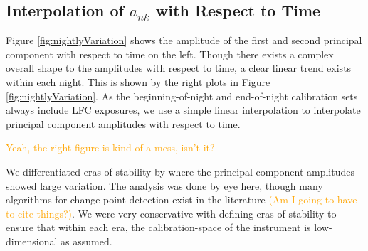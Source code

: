 \documentclass[twocolumn]{aastex63}
\newcommand{\lz}[1]{\textcolor{orange}{#1}}
\begin{document}
\subsection{Interpolation of $a_{nk}$ with Respect to Time}
Figure \ref{fig:nightlyVariation} shows the amplitude of the first and second principal component with respect to time on the left.  Though there exists a complex overall shape to the amplitudes with respect to time, a clear linear trend exists within each night.  This is shown by the right plots in Figure  \ref{fig:nightlyVariation}.  As the beginning-of-night and end-of-night calibration sets always include LFC exposures, we use a simple linear interpolation to interpolate principal component amplitudes with respect to time.

\lz{Yeah, the right-figure is kind of a mess, isn't it?}

We differentiated eras of stability by where the principal component amplitudes showed large variation.  The analysis was done by eye here, though many algorithms for change-point detection exist in the literature \lz{(Am I going to have to cite things?)}.  We were very conservative with defining eras of stability to ensure that within each era, the calibration-space of the instrument is low-dimensional as assumed.
\end{document}
